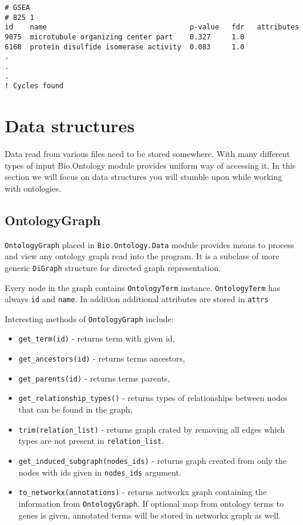 \begin{verbatim}
# GSEA
# 825 1
id    name                                  p-value   fdr   attributes
9075  microtubule organizing center part    0.327     1.0
6168  protein disulfide isomerase activity  0.083     1.0
.
.
.
! Cycles found 
\end{verbatim}

\section{Data structures}
Data read from various files need to be stored somewhere. With many different
types of input Bio.Ontology module provides uniform way of accessing it. In this
section we will focus on data structures you will stumble upon while working
with ontologies.

\subsection{OntologyGraph}
\verb|OntologyGraph| placed in \verb|Bio.Ontology.Data| module provides means
to process and view any ontology graph read into the program. It is a subclass
of more generic \verb|DiGraph| structure for directed graph representation.

Every node in the graph contains \verb|OntologyTerm| instance. \verb|OntologyTerm|
has always \verb|id| and \verb|name|. In addition additional attributes are
stored in \verb|attrs|

Interesting methods of \verb|OntologyGraph| include:
\begin{itemize}
\item \verb|get_term(id)| - returns term with given id,
\item \verb|get_ancestors(id)| - returns terms ancestors,
\item \verb|get_parents(id)| - returns terms parents,
\item \verb|get_relationship_types()| - returns types of relationships between
nodes that can be found in the graph,
\item \verb|trim(relation_list)| - returns graph crated by removing all edges
which types are not present in \verb|relation_list|.
\item \verb|get_induced_subgraph(nodes_ids)| - returns graph created from only
the nodes with ids given in \verb|nodes_ids| argument.
\item \verb|to_networkx(annotations)| - returns networkx graph
containing the information from \verb|OntologyGraph|. If optional map
from ontology terms to genes is given, annotated terms will be
stored in networkx graph as well.
\end{itemize}

